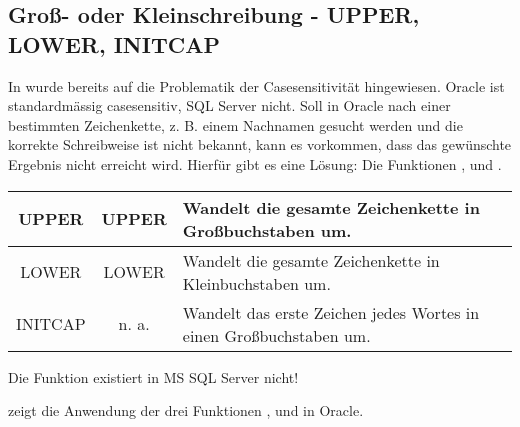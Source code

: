       \subsection{Groß- oder Kleinschreibung - UPPER, LOWER, INITCAP}
        In  wurde bereits auf die Problematik der Casesensitivität hingewiesen. Oracle ist standardmässig casesensitiv, SQL Server nicht. Soll in Oracle nach einer bestimmten Zeichenkette, z. B. einem Nachnamen gesucht werden und die korrekte Schreibweise ist nicht bekannt, kann es vorkommen, dass das gewünschte Ergebnis nicht erreicht wird. Hierfür gibt es eine Lösung: Die Funktionen ,  und .
        \begin{center}
          \label{srfstringfct1}
          \begin{small}
            \tabletail{
              \hline
            }
            \tablelasttail {
              \hline
            }
            \begin{supertabular}{|c|c|p{11cm}|}
              UPPER & UPPER& Wandelt die gesamte Zeichenkette in Großbuchstaben um.\\
              \hline
              LOWER & LOWER & Wandelt die gesamte Zeichenkette in Kleinbuchstaben um.\\
              \hline
              INITCAP & n. a.& Wandelt das erste Zeichen jedes Wortes in einen Großbuchstaben um.\\
            \end{supertabular}
          \end{small}
        \end{center}
        \begin{merke}
          Die Funktion  existiert in MS SQL Server nicht!
        \end{merke}
\clearpage
         zeigt die Anwendung der drei Funktionen ,  und  in Oracle.
